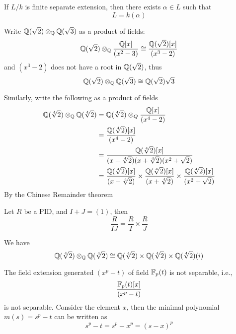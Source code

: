 \begin{prop}
    If $L/k$ is finite separate extension, then there exists $\alpha\in L$ such that 
    \begin{equation*}
        L=k(\alpha)
    \end{equation*}
\end{prop}
\begin{example}
    Write $\mathbb{Q}(\sqrt{2})\otimes_{\mathbb{Q}}\mathbb{Q}(\sqrt{3})$ as a product of fields: 
    \begin{equation*}
        \mathbb{Q}(\sqrt{2})\otimes_{\mathbb{Q}}\frac{\mathbb{Q}[x]}{(x^2-3)}\cong\frac{\mathbb{Q}(\sqrt{2})[x]}{(x^3-2)}
    \end{equation*}
    and $(x^3-2)$ does not have a root in $\mathbb{Q}(\sqrt{2})$, thus 
    \begin{equation*}
        \mathbb{Q}(\sqrt{2})\otimes_{\mathbb{Q}}\mathbb{Q}(\sqrt{3})\cong\mathbb{Q}(\sqrt{2})\sqrt{3}
    \end{equation*}
\end{example}

\begin{example}
    Similarly, write the following as a product of fields
    \begin{align*}
        \mathbb{Q}(\sqrt[4]{2})\otimes_{\mathbb{Q}}\mathbb{Q}(\sqrt[4]{2})&=\mathbb{Q}(\sqrt[4]{2})\otimes_Q\frac{\mathbb{Q}[x]}{(x^4-2)}\\
        &=\frac{\mathbb{Q}(\sqrt[4]{2})[x]}{(x^4-2)}\\
        &=\frac{\mathbb{Q}(\sqrt[4]{2})[x]}{(x-\sqrt[4]{2})(x+\sqrt[4]{2})(x^2+\sqrt{2})}\\
        &=\frac{\mathbb{Q}(\sqrt[4]{2})[x]}{(x-\sqrt[4]{2})}\times\frac{\mathbb{Q}(\sqrt[4]{2})[x]}{(x+\sqrt[4]{2})}\times \frac{\mathbb{Q}(\sqrt[4]{2})[x]}{(x^2+\sqrt{2})}
    \end{align*}
    By the Chinese Remainder theorem 
    \begin{lem}[CRT]
        Let $R$ be a PID, and $I+J=(1)$, then 
        \begin{equation*}
            \frac{R}{IJ}=\frac{R}{I}\times\frac{R}{J}
        \end{equation*}
    \end{lem}
    We have 
    \begin{equation*}
        \mathbb{Q}(\sqrt[4]{2})\otimes_{\mathbb{Q}}\mathbb{Q}(\sqrt[4]{2})\cong \mathbb{Q}(\sqrt[4]{2})\times \mathbb{Q}(\sqrt[4]{2})\times \mathbb{Q}(\sqrt[4]{2})(i)
    \end{equation*}
\end{example}


\begin{example}
    The field extension generated $(x^p-t)$ of field $\mathbb{F}_p(t)$ is not separable, i.e., 
    \begin{equation*}
        \frac{\mathbb{F}_p(t)[x]}{(x^p-t)}
    \end{equation*}
    is not separable. Consider the element $x$, then the minimal polynomial $m(s)=s^p-t$ can be written as 
    \begin{equation*}
        s^p-t=s^p-x^p=(s-x)^p
    \end{equation*}
\end{example}

